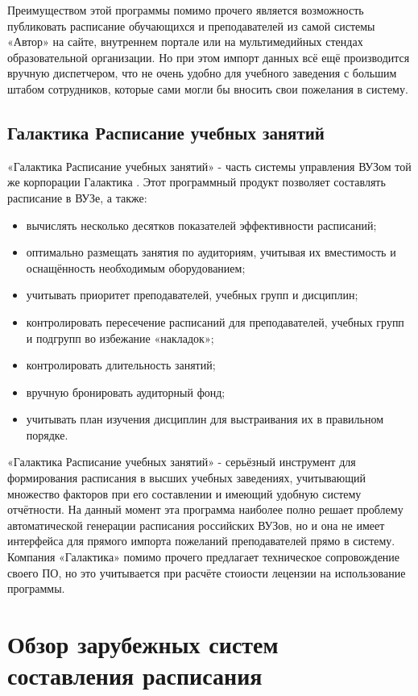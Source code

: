 Преимуществом этой программы помимо прочего является возможность публиковать расписание обучающихся и преподавателей из самой системы «Автор» на сайте, внутреннем портале или на мультимедийных стендах образовательной организации. Но при этом импорт данных всё ещё производится вручную диспетчером, что не очень удобно для учебного заведения с большим штабом сотрудников, которые сами могли бы вносить свои пожелания в систему.

\subsection{Галактика Расписание учебных занятий}
«Галактика Расписание учебных занятий» - часть системы управления ВУЗом той же корпорации Галактика  \cite{galaktica}. Этот программный продукт позволяет составлять расписание в ВУЗе, а также:

\begin{itemize}
	\item вычислять несколько десятков показателей эффективности расписаний;
	\item оптимально размещать занятия по аудиториям, учитывая их вместимость и оснащённость необходимым оборудованием;
	\item учитывать приоритет преподавателей, учебных групп и дисциплин;
	\item контролировать пересечение расписаний для преподавателей, учебных групп и подгрупп во избежание «накладок»;
	\item контролировать длительность занятий;
	\item вручную бронировать аудиторный фонд;
	\item учитывать план изучения дисциплин для выстраивания их в правильном порядке.
\end{itemize}

«Галактика Расписание учебных занятий» - серьёзный инструмент для формирования расписания в высших учебных заведениях, учитывающий множество факторов при его составлении и имеющий удобную систему отчётности. На данный момент эта программа наиболее полно решает проблему автоматической генерации расписания российских ВУЗов, но и она не имеет интерфейса для прямого импорта пожеланий преподавателей прямо в систему. Компания «Галактика» помимо прочего предлагает техническое сопровождение своего ПО, но это учитывается при расчёте стоиости лецензии на использование программы.
	
\section{Обзор зарубежных систем составления расписания} \label{ch1:sec3}	


